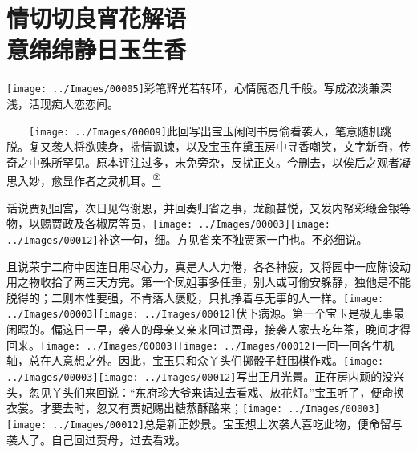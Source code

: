 

\chapter{情切切良宵花解语\\意绵绵静日玉生香}

{\texttt{[image: ../Images/00005]}彩笔辉光若转环，心情魔态几千般。写成浓淡兼深浅，活现痴人恋恋间。}

{　　\texttt{[image: ../Images/00009]}此回写出宝玉闲闯书房偷看袭人，笔意随机跳脱。复又袭人将欲赎身，揣情讽谏，以及宝玉在黛玉房中寻香嘲笑，文字新奇，传奇之中殊所罕见。原本评注过多，未免旁杂，反扰正文。今删去，以俟后之观者凝思入妙，愈显作者之灵机耳。}\href{../Text/part0023_split_000.html\#lnkback_2_a}{\textsuperscript{②}}{}

话说贾妃回宫，次日见驾谢恩，并回奏归省之事，龙颜甚悦，又发内帑彩缎金银等物，以赐贾政及各椒房等员，{\texttt{[image: ../Images/00003]}\texttt{[image: ../Images/00012]}\footnotesize \kaishu 补这一句，细。方见省亲不独贾家一门也。}不必细说。

且说荣宁二府中因连日用尽心力，真是人人力倦，各各神疲，又将园中一应陈设动用之物收拾了两三天方完。第一个凤姐事多任重，别人或可偷安躲静，独他是不能脱得的；二则本性要强，不肯落人褒贬，只扎挣着与无事的人一样。{\texttt{[image: ../Images/00003]}\texttt{[image: ../Images/00012]}\footnotesize \kaishu 伏下病源。}第一个宝玉是极无事最闲暇的。偏这日一早，袭人的母亲又亲来回过贾母，接袭人家去吃年茶，晚间才得回来。{\texttt{[image: ../Images/00003]}\texttt{[image: ../Images/00012]}\footnotesize \kaishu 一回一回各生机轴，总在人意想之外。}因此，宝玉只和众丫头们掷骰子赶围棋作戏。{\texttt{[image: ../Images/00003]}\texttt{[image: ../Images/00012]}\footnotesize \kaishu 写出正月光景。}正在房内顽的没兴头，忽见丫头们来回说：``东府珍大爷来请过去看戏、放花灯。''宝玉听了，便命换衣裳。才要去时，忽又有贾妃赐出糖蒸酥酪来；{\texttt{[image: ../Images/00003]}\texttt{[image: ../Images/00012]}\footnotesize \kaishu 总是新正妙景。}宝玉想上次袭人喜吃此物，便命留与袭人了。自己回过贾母，过去看戏。

